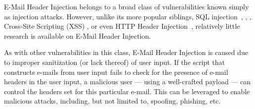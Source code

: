 E-Mail Header Injection belongs to a broad class of vulnerabilities known simply as injection attacks. However, unlike its more popular siblings, SQL injection~\cite{sql1}, \cite{sql0}, \cite{sql2}, Cross-Site Scripting (XSS) \cite{Injection1}, \cite{KleinAmit} or even HTTP Header Injection~\cite{sessionride}, relatively little research is available on E-Mail Header Injection.

As with other vulnerabilities in this class, E-Mail Header Injection is caused due to improper sanitization (or lack thereof) of user input. If the script that constructs e-mails from user input fails to check for the presence of e-mail headers in the user input, a malicious user --- using a well-crafted payload --- can control the headers set for this particular e-mail. This can be leveraged to enable malicious attacks, including, but not limited to, spoofing, phishing, etc.